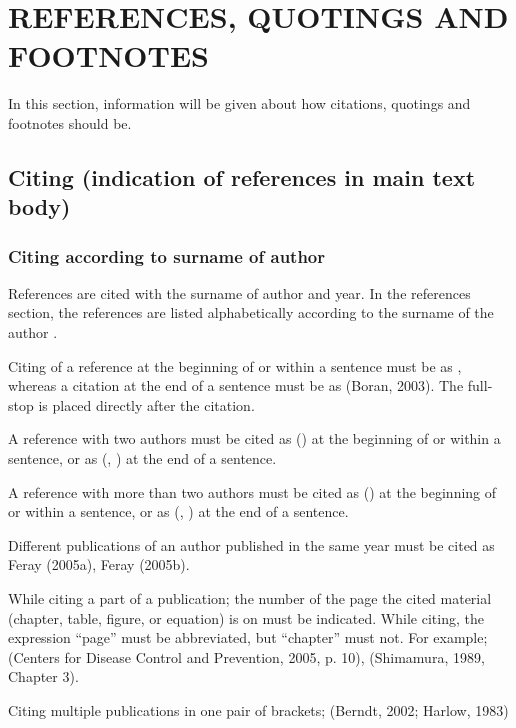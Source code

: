 \chapter{REFERENCES, QUOTINGS AND FOOTNOTES}\label{ch:ch4}

In this section, information will be given about how citations, quotings and footnotes should be.

\section{Citing (indication of references in main text body)}

\subsection{Citing according to surname of author}

References are cited with the surname of author and year. In the references section, the references are listed alphabetically according to the surname of the author \parencite{acar97}.

Citing of a reference at the beginning of or within a sentence must be as \textcite{harper2007}, whereas a citation at the end of a sentence must be as (Boran, 2003). The full-stop is placed directly after the citation. 

A reference with two authors must be cited as \citeauthor{mccaffrey88} (\citeyear{mccaffrey88}) at the beginning of or within a sentence, or as (\citeauthor{mccaffrey88}, \citeyear{mccaffrey88}) at the end of a sentence. 

A reference with more than two authors must be cited as \citeauthor{vanden2001} (\citeyear{vanden2001}) at the beginning of or within a sentence, or as (\citeauthor{vanden2001}, \citeyear{vanden2001}) at the end of a sentence. 

Different publications of an author published in the same year must be cited as Feray (2005a), Feray (2005b).

While citing a part of a publication; the number of the page the cited material (chapter, table, figure, or equation) is on must be indicated. While citing, the expression “page” must be abbreviated, but “chapter” must not. For example; (Centers for Disease Control and Prevention, 2005, p. 10), (Shimamura, 1989, Chapter 3). 

Citing multiple publications in one pair of brackets; (Berndt, 2002; Harlow, 1983) 

